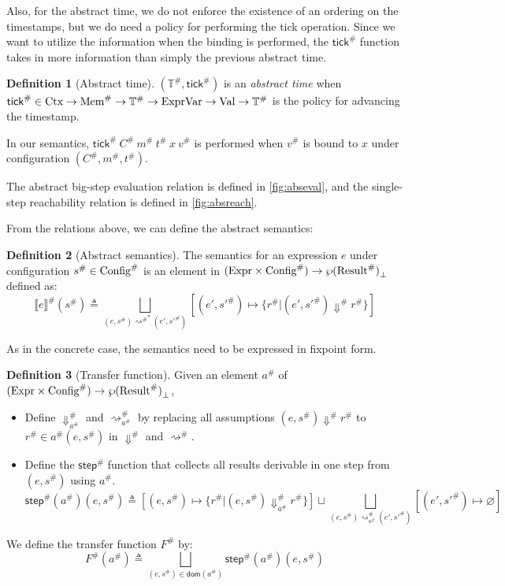 \documentclass[acmsmall,screen,review]{acmart}
\theoremstyle{definition}
\newtheorem{definition}{Definition}[section]
\newcommand*{\A}[1]{{#1}^{\#}}
\newcommand*{\Expr}{\text{Expr}}
\newcommand*{\ExprVar}{\text{ExprVar}}
\newcommand*{\Time}{\mathbb{T}}
\newcommand*{\ATime}{\A{\Time}}
\newcommand*{\Ctx}[1]{\text{Ctx}\vphantom{#1}}
\newcommand*{\Value}[1]{\text{Val}\vphantom{#1}}
\newcommand*{\mem}{m}
\newcommand*{\AMem}[1]{\A{\text{Mem}}\vphantom{#1}}
\newcommand*{\AConfig}[1]{\A{\text{Config}}\vphantom{#1}}
\newcommand*{\AResult}[1]{\A{\text{Result}}\vphantom{#1}}
\newcommand*{\sembracket}[1]{\lBrack{#1}\rBrack}
\newcommand*{\tick}{\mathsf{tick}}
\begin{document}
Also, for the abstract time, we do not enforce the existence of an ordering on the timestamps, but we do need a policy for performing the tick operation.
Since we want to utilize the information when the binding is performed, the $\A{\tick}$ function takes in more information than simply the previous abstract time.
\begin{definition}[Abstract time]
  $(\ATime,\A{\tick})$ is an \emph{abstract time} when $\A{\tick}\in\Ctx{\ATime}\rightarrow\AMem{\ATime}\rightarrow\ATime\rightarrow\ExprVar\rightarrow\Value{\ATime}\rightarrow\ATime$ is the policy for advancing the timestamp.
\end{definition}
In our semantics, $\A{\tick}\:\A{C}\:\A{\mem}\:\A{t}\:x\:\A{v}$ is performed when $\A{v}$ is bound to $x$ under configuration $(\A{C},\A{\mem},\A{t})$.

The abstract big-step evaluation relation is defined in \ref{fig:abseval}, and the single-step reachability relation is defined in \ref{fig:absreach}.

From the relations above, we can define the abstract semantics:
\begin{definition}[Abstract semantics]
  The semantics for an expression $e$ under configuration $\A{s}\in\AConfig{\ATime}$ is an element in $(\Expr\times\AConfig{\ATime})\rightarrow{\wp(\AResult{\ATime})}_{\bot}$ defined as:
  \[
    \A{\sembracket{e}}(\A{s})\triangleq\bigsqcup_{(e,\A{s}){\A\rightsquigarrow}^{*}(e',\A{s'})}[(e',\A{s'})\mapsto\{\A{r}|(e',\A{s'})\A\Downarrow \A{r}\}]
  \]
\end{definition}

As in the concrete case, the semantics need to be expressed in fixpoint form.

\begin{definition}[Transfer function]
  Given an element $\A{a}$ of $(\Expr\times\AConfig{\ATime})\rightarrow{\wp(\AResult{\ATime})}_{\bot}$,

  \begin{itemize}
    \item Define $\A{\Downarrow}_{\A{a}}$ and $\A{\rightsquigarrow}_{\A{a}}$ by replacing all assumptions $(e,\A{s})\A\Downarrow\A{r}$ to $\A{r}\in\A{a}(e,\A{s})$ in $\A\Downarrow$ and $\A\rightsquigarrow$.
    \item Define the $\A{\mathsf{step}}$ function that collects all results derivable in one step from $(e,\A{s})$ using $\A{a}$.
          \[
            \A{\mathsf{step}}(\A{a})(e,\A{s})\triangleq
            [(e,\A{s})\mapsto\{\A{r}|(e,\A{s})\A{\Downarrow}_{\A{a}}\A{r}\}]
            \sqcup
            \bigsqcup_{(e,\A{s})\A{\rightsquigarrow}_{\A{a}}(e',\A{s'})}[(e',\A{s'})\mapsto\varnothing]
          \]
  \end{itemize}

  We define the transfer function $\A{F}$ by:
  \[
    \A{F}(\A{a})\triangleq
    \bigsqcup_{(e,\A{s})\in\mathsf{dom}(\A{a})}
    {\A{\mathsf{step}}(\A{a})(e,\A{s})}
  \]
\end{definition}
\end{document}
